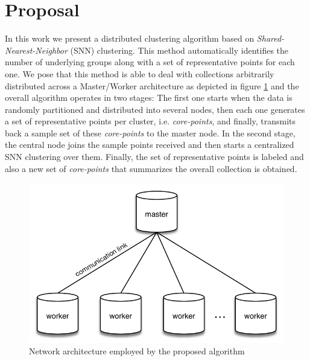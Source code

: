 \documentclass[a4paper]{article}
\begin{document}
\section{Proposal}
In this work we present a distributed clustering algorithm based on \textit{Shared-Nearest-Neighbor} (SNN) clustering. This method automatically identifies the number of  underlying groups along with a set of representative points for each one.
We pose that this method is able to deal with collections arbitrarily distributed across a Master/Worker architecture as depicted in figure \ref{fig:distributed_architecture} and the overall algorithm operates in two stages: The first one starts when the data is randomly partitioned and distributed into several nodes, then each one generates a set of representative points per cluster, i.e. \textit{core-points}, and finally, transmits back a sample set of these \textit{core-points} to the master node. In the second stage, the central node joins the sample points received and then starts a centralized SNN clustering over them. Finally, the set of representative points is labeled and also a new set of \textit{core-points} that summarizes the overall collection is obtained.  

\begin{figure}[h]
\centering
  \includegraphics[scale=0.8]{distributed_architecture.pdf}
  \caption{Network architecture employed by the proposed algorithm}
  \label{fig:distributed_architecture}
\end{figure}
\end{document}
